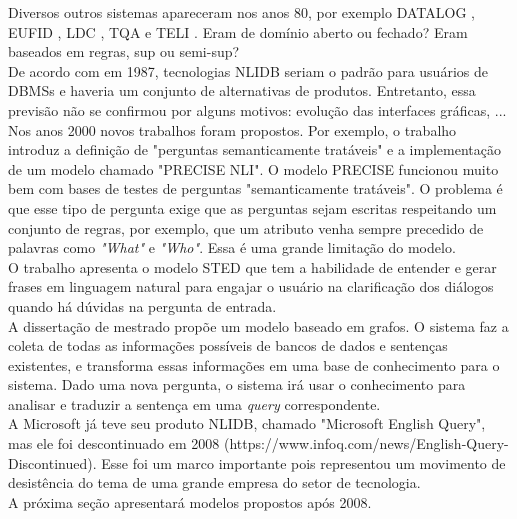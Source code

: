 \documentclass{article}
\begin{document}
Diversos outros sistemas apareceram nos anos 80, por exemplo DATALOG \citep{hafner1984interaction}, EUFID \citep{templeton1983problems}, LDC \citep{ballard1984ldc}, TQA \citep{damerau1981operating} e TELI \citep{ballard1986semantic}. Eram de domínio aberto ou fechado? Eram baseados em regras, sup ou semi-sup?\\

De acordo com \citep{johnson1984natural} em 1987, tecnologias NLIDB seriam o padrão para usuários de DBMSs e haveria um conjunto de alternativas de produtos. Entretanto, essa previsão não se confirmou por alguns motivos: evolução das interfaces gráficas, ...\\

Nos anos 2000 novos trabalhos foram propostos. Por exemplo, o trabalho \cite{popescu2003towards} introduz a definição de "perguntas semanticamente tratáveis" e a implementação de um modelo chamado "PRECISE NLI". O modelo PRECISE funcionou muito bem com bases de testes de perguntas "semanticamente tratáveis". O problema é que esse tipo de pergunta exige que as perguntas sejam escritas respeitando um conjunto de regras, por exemplo, que um atributo venha sempre precedido de palavras como \textit{"What"} e \textit{"Who"}. Essa é uma grande limitação do modelo. \\

O trabalho \citep{minock2005phrasal} apresenta o modelo STED que tem a habilidade de entender e gerar frases em linguagem natural para engajar o usuário na clarificação dos diálogos quando há dúvidas na pergunta de entrada. \\

A dissertação de mestrado \citep{chandra2006natural} propõe um modelo baseado em grafos. O sistema faz a coleta de todas as informações possíveis de bancos de dados e sentenças existentes, e transforma essas informações em uma base de conhecimento para o sistema. Dado uma nova pergunta, o sistema irá usar o conhecimento para analisar e traduzir a sentença em uma \textit{query} correspondente. \\

A Microsoft já teve seu produto NLIDB, chamado "Microsoft English Query", mas ele foi descontinuado em 2008 (https://www.infoq.com/news/English-Query-Discontinued). Esse foi um marco importante pois representou um movimento de desistência do tema de uma grande empresa do setor de tecnologia.\\

A próxima seção apresentará modelos propostos após 2008.
\end{document}
